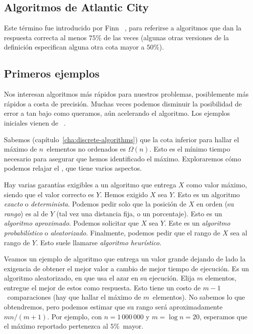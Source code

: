 \subsection{Algoritmos de Atlantic City}
\label{sec:atlantic-city}

   Este término fue introducido por Finn~%
     \cite{finn82:_compar_probab_tests_primal},
   para referirse a algoritmos que dan la respuesta correcta al menos \(75\%\)
   de las veces
   (algunas otras versiones de la definición
    especifican alguna otra cota mayor a \(50\%\)).

\subsection{Primeros ejemplos}
\label{sec:randomized-examples}

  Nos interesan algoritmos más rápidos para nuestros problemas,
  posiblemente más rápidos a costa de precisión.
  Muchas veces podemos disminuir la posibilidad de error
  a tan bajo como queramos,
  aún acelerando el algoritmo.
  Los ejemplos iniciales vienen de~%
    \cite{OpenDSA16:_senior_algorithms}.

  Sabemos
  (capítulo~\ref{cha:discrete-algorithms})
  que la cota inferior para hallar el máximo
  de \(n\)~elementos no ordenados
  es \(\Omega(n)\).
  Esto es el mínimo tiempo necesario
  para asegurar que hemos identificado el máximo.
  Exploraremos cómo podemos relajar el ,
  que tiene varios aspectos.

  Hay varias garantías exigibles a un algoritmo
  que entrega \(X\) como valor máximo,
  siendo que el valor correcto es \(Y\).
  Hemos exigido \(X\) sea \(Y\).
  Esto es un algoritmo \emph{exacto} o \emph{determinista}.
  Podemos pedir solo que la posición de \(X\) en orden
  (su \emph{rango})
  es  al de \(Y\)
  (tal vez una distancia fija,
   o un porcentaje).
  Esto es un \emph{algoritmo aproximado}.
  Podemos solicitar que \(X\)  sea \(Y\).
  Este es un \emph{algoritmo probabilístico} o \emph{aleatorizado}.
  Finalmente,
  podemos pedir
  que el rango de \(X\)  sea 
  al rango de \(Y\).
  Esto suele llamarse \emph{algoritmo heurístico}.

  Veamos un ejemplo de algoritmo que entrega un valor grande
  dejando de lado la exigencia de obtener el mejor valor
  a cambio de mejor tiempo de ejecución.
  Es un algoritmo aleatorizado,
  en que usa el azar en su ejecución.
  Elija \(m\) elementos,
  entregue el mejor de estos como respuesta.
  Esto tiene un costo de \(m - 1\)~comparaciones
  (hay que hallar el máximo de \(m\)~elementos).
  No sabemos lo que obtendremos,
  pero podemos estimar que su rango será aproximadamente \(m n / (m + 1)\).
  Por ejemplo,
  con \(n = 1\,000\,000\) y \(m = \log n = 20\),
  esperamos que el máximo reportado pertenezca al \(5\%\)~mayor.

